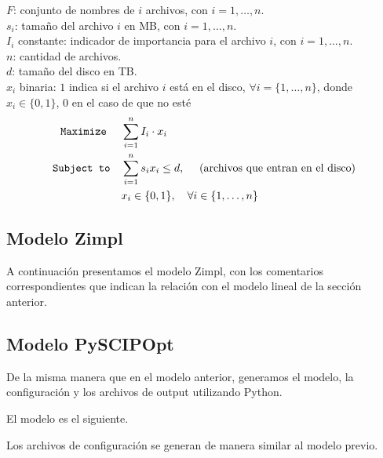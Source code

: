 \documentclass[11pt, a4paper, pdftex]{article}
\begin{document}
$F$: conjunto de nombres de $i$ archivos, con $i = 1, \ldots, n$. \\

$s_{i}$: tamaño del archivo $i$ en MB, con $i = 1, \ldots, n$. \\

$I_i$ constante: indicador de importancia para el archivo $i$, con $i = 1, \ldots, n$. \\

$n$: cantidad de archivos. \\

$d$: tamaño del disco en TB. \\ 

$x_{i}$ binaria: $1$ indica si el archivo $i$ está en el disco, $\forall i = \{1, \ldots, n\}$, donde $x_{i} \in \{0, 1\}$, $0$ en el caso de que no esté\\

\begin{alignat*}{2}
	\texttt{Maximize}\quad\,\,
	& \sum_{i = 1}^{n} I_{i} \cdot x_{i}\\
	\texttt{Subject to}\quad
	& \sum_{i = 1}^{n} s_{i} x_{i} \le d,\ \quad\text{(archivos que entran en el disco)}\\
	& x_{i} \in \{0,1\}, \quad \forall i \in \{1, \ldots, n\}
\end{alignat*}

\newpage
\subsection{Modelo Zimpl}

A continuación presentamos el modelo Zimpl, con los comentarios correspondientes que indican la relación con el modelo lineal de la sección anterior.



\newpage
\subsection{Modelo PySCIPOpt}

De la misma manera que en el modelo anterior, generamos el modelo, la configuración y los 
archivos de output utilizando Python.

El modelo es el siguiente.



\newpage

Los archivos de configuración se generan de manera similar al modelo previo.
\end{document}
